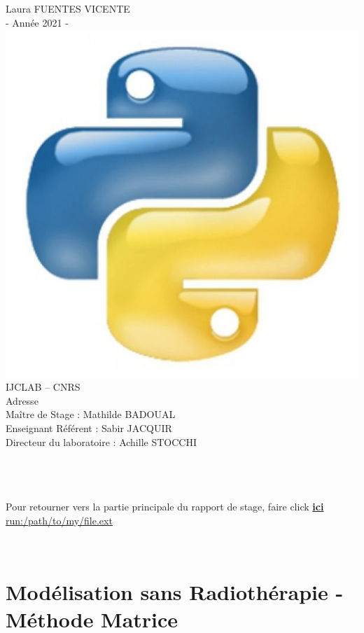 \documentclass[12pt,a4paper]{article}
\begin{document}
{{\begin{center}
 	Laura FUENTES VICENTE \\
	- Année 2021 - \\
\vspace{2cm}	
    \includegraphics[scale=0.2]{13541540425_63372041e1_z.jpg}
    \\
\vspace{2cm}
	IJCLAB – CNRS\\
	Adresse \\
	Maître de Stage : Mathilde BADOUAL \\ 
	Enseignant Référent : Sabir JACQUIR \\
	Directeur du laboratoire : Achille STOCCHI \\
	\vspace{2cm}
\end{center}}
}
\newpage
\\

\\
\doublespacing
\tableofcontents
\\
Pour retourner vers la partie principale du rapport de stage, faire click \href{run:./suite-rapport.pdf}{\textbf{ici}} 
\url{run:/path/to/my/file.ext}

\newpage
\\
\singlespacing
\section{Modélisation sans Radiothérapie - Méthode Matrice}
\\
\end{document}
